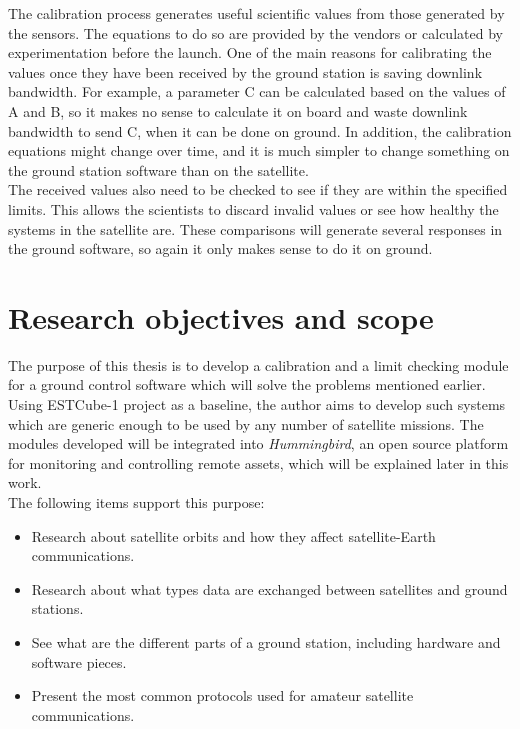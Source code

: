 The calibration process generates useful scientific values from those generated by the sensors. The equations to do so are provided by the vendors or calculated by experimentation before the launch. One of the main reasons for calibrating the values once they have been received by the ground station is saving downlink bandwidth. For example, a parameter C can be calculated based on the values of A and B, so it makes no sense to calculate it on board and waste downlink bandwidth to send C, when it can be done on ground.  In addition, the calibration equations might change over time, and it is much simpler to change something on the ground station software than on the satellite.\\


The received values also need to be checked to see if they are within the specified limits. This allows the scientists to discard invalid values or see how healthy the systems in the satellite are. These comparisons will generate several responses in the ground software, so again it only makes sense to do it on ground. 
\pagebreak

\section{Research objectives and scope}

The purpose of this thesis is to develop a calibration and a limit checking module for a ground control software which will solve the problems mentioned earlier.\\

Using ESTCube-1 project as a baseline, the author aims to develop such systems which are generic enough to be used by any number of satellite missions. The modules developed will be integrated into \emph{Hummingbird}, an open source platform for monitoring and controlling remote assets, which will be explained later in this work.\\ 
The following items support this purpose:
\begin{itemize}
	\item Research about satellite orbits and how they affect satellite-Earth communications.
	\item Research about what types data are exchanged between satellites and ground stations.
	\item See what are the different parts of a ground station, including hardware and software pieces.
	\item Present the most common protocols used for amateur satellite communications. 
\end{itemize}

